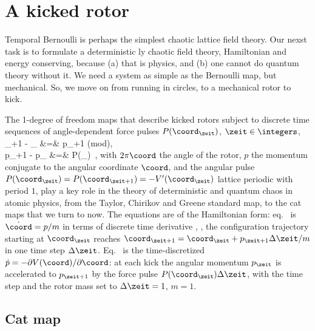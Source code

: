 
\section{A kicked rotor}
\label{s:kickRot}

Temporal Bernoulli is perhaps the simplest chaotic lattice field
theory. Our nexst task is to formulate a deterministic {\spt}ly chaotic
field theory, Hamiltonian and energy conserving, because (a) that is
physics, and (b) one cannot do quantum theory without it. We need a
system as simple as the Bernoulli map, but mechanical. So, we move on
from running in circles, to a mechanical rotor to kick.

The 1-degree of freedom maps that describe kicked rotors
subject to discrete time sequences of angle-dependent force pulses
$P(\coord_{\zeit})$, $\zeit\in\integers$,
\bea
\coord_{\zeit+1} - \coord_{\zeit} &=& p_{\zeit+1} \qquad  (\mbox{mod}),
    \label{LC21PerViv2.1b}\\
p_{\zeit+1} - p_{\zeit} &=& P(\coord_{\zeit})
\,,
    \label{LC21PerViv2.1a}
\eea
with $2\pi \coord$ the  angle of the rotor, $p$ the momentum conjugate to
the angular coordinate $\coord$, and the angular pulse
$P(\coord_{\zeit})=P(\coord_{\zeit+1})=-V'(\coord_{\zeit})$ lattice
periodic with period $1$, play a key role in the theory of deterministic
and quantum chaos in  atomic physics, from the Taylor, Chirikov and
Greene  standard map, to the cat maps that
we turn to now. The equations are of the Hamiltonian form:
eq.~ is $\dot{\coord}=p/m$ in terms of discrete
time derivative , \ie, the configuration trajectory
starting at $\coord_{\zeit}$ reaches
$\coord_{\zeit+1}=\coord_{\zeit}+p_{\zeit+1}\Delta{\zeit}/m$ in one time
step $\Delta{\zeit}$. Eq.~ is the time-discretized
$\dot{p}=-\partial V(\coord)/\partial \coord$: at each kick the angular
momentum $p_{\zeit}$ is accelerated to $p_{\zeit+1}$ by the force pulse
$P(\coord_{\zeit})\Delta{\zeit}$, with the time step and the rotor mass
set to $\Delta{\zeit}=1$,  $m=1$.

\subsection{Cat map}
\label{s:catPV}

